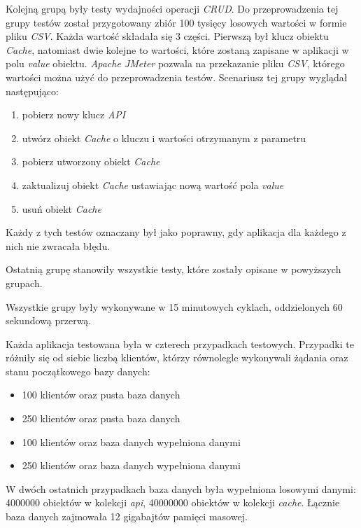 Kolejną grupą były testy wydajności operacji \textsl{CRUD}. Do przeprowadzenia tej grupy testów został przygotowany zbiór 100 tysięcy losowych wartości w formie pliku \textsl{CSV}. Każda wartość składała się 3 części. Pierwszą był klucz obiektu \textsl{Cache}, natomiast dwie kolejne to wartości, które zostaną zapisane w aplikacji w polu \textsl{value} obiektu. \textsl{Apache JMeter} pozwala na przekazanie pliku \textsl{CSV}, którego wartości można użyć do przeprowadzenia testów. Scenariusz tej grupy wyglądał następująco:
\begin{enumerate}
    \item pobierz nowy klucz \textsl{API}
    \item utwórz obiekt \textsl{Cache} o kluczu i wartości otrzymanym z parametru
    \item pobierz utworzony obiekt \textsl{Cache} 
    \item zaktualizuj obiekt \textsl{Cache} ustawiając nową wartość pola \textsl{value}
    \item usuń obiekt \textsl{Cache}
\end{enumerate}
Każdy z tych testów oznaczany był jako poprawny, gdy aplikacja dla każdego z nich nie zwracała błędu.

Ostatnią grupę stanowiły wszystkie testy, które zostały opisane w powyższych grupach. 

Wszystkie grupy były wykonywane w 15 minutowych cyklach, oddzielonych 60 sekundową przerwą.

Każda aplikacja testowana była w czterech przypadkach testowych. Przypadki te różniły się od siebie liczbą klientów, którzy równolegle wykonywali żądania oraz stanu początkowego bazy danych:
\begin{itemize}
    \item 100 klientów oraz pusta baza danych
    \item 250 klientów oraz pusta baza danych
    \item 100 klientów oraz baza danych wypełniona danymi
    \item 250 klientów oraz baza danych wypełniona danymi
\end{itemize}
W dwóch ostatnich przypadkach baza danych była wypełniona losowymi danymi: 4000000 obiektów w kolekcji \textsl{api}, 40000000 obiektów w kolekcji \textsl{cache}. Łącznie baza danych zajmowała 12 gigabajtów pamięci masowej.

